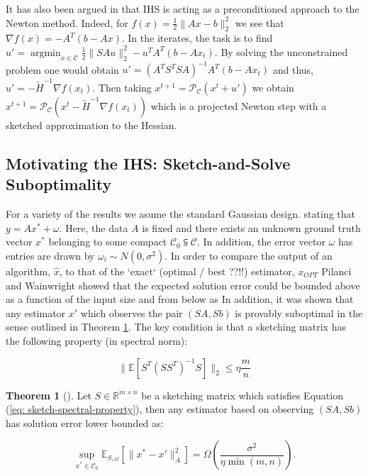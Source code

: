 \documentclass[twoside]{article}
\newcommand{\R}{\mathbb{R}}
\newcommand{\E}{\mathbb{E}}
\theoremstyle{definition}\newtheorem{thm}{Theorem}[section]
\theoremstyle{definition}\newtheorem{mydef}[thm]{Definition}
\theoremstyle{definition}\newtheorem{rem}[thm]{Remark}
\theoremstyle{definition}\newtheorem{prop}[thm]{Proposition}
\theoremstyle{definition}\newtheorem{example}[thm]{Example}
\theoremstyle{definition}\newtheorem{claim}[thm]{Claim}
\theoremstyle{definition}\newtheorem{Qu}[thm]{Question}
\theoremstyle{definition}\newtheorem{Lemma}[thm]{Lemma}
\theoremstyle{definition}\newtheorem{Cor}[thm]{Corollary}
\theoremstyle{definition}\newtheorem{Fact}[]{Fact}
\DeclareMathOperator*{\argmin}{argmin}
\begin{document}
\color{red}
It has also been argued in \cite{wang2017sketching} that IHS is acting as
a preconditioned approach to the Newton method.
Indeed, for $f(x) = \frac{1}{2} \|Ax-b\|_2^2$ we see that $\nabla f(x) =
-A^T(b-Ax)$.
In the iterates, the task is to find $u' = \argmin_{x \in \mathcal{C}}
\frac{1}{2}\|SAu\|_2^2 - u^TA^T(b-Ax_t)$.
By solving the unconstrained problem one would obtain $u' = (A^TS^TSA)^{-1}
A^T(b-Ax_t)$ and thus, $u' = - \tilde{H}^{-1} \nabla f(x_t)$.
Then taking $x^{t+1} = \mathcal{P}_{\mathcal{C}} (x^t + u')$ we obtain
$x^{t+1} = \mathcal{P}_{\mathcal{C}} (x^t - \tilde{H}^{-1}\nabla f(x_t))$
which is a projected Newton step with a sketched approximation to
the Hessian.
\color{black}

\subsection{Motivating the IHS: Sketch-and-Solve Suboptimality}

For a variety of the results we asume the standard Gaussian design.
stating that $y = A x^* + \omega$.
Here, the data $A$ is fixed and there exists an unknown ground truth
vector $x^*$ belonging to some compact $\mathcal{C}_0 \subseteqq \mathcal{C}$.
In addition, the error vector $\omega$ has entries are drawn
by $\omega_i \sim N(0, \sigma^2)$.
In order to compare the output of an algorithm, $\hat{x}$, to that of the
`exact` (optimal / best ??!!) estimator, $x_{OPT}$ Pilanci and Wainwright
showed that the expected solution error could be bounded above as a function
of the input size and from below as
In addition, it was shown that any estimator $x'$ which observes the pair
$(SA, Sb)$ is provably suboptimal in the sense outlined in Theorem
\ref{thm: clsq-lower-bound}.
The key condition is that a sketching matrix has the following
property (in spectral norm):

\begin{equation} \label{eq: sketch-spectral-property}
  \| \E \left[ S^T (S S^T)^{-1} S \right] \|_2 \le \eta \frac{m}{n}
\end{equation}

\begin{thm}[\cite{pilanci2016iterative}] \label{thm: clsq-lower-bound}
  Let $S \in \R^{m \times n}$ be a sketching matrix which satisfies
  Equation (\ref{eq: sketch-spectral-property}), then any estimator
  based on observing $(SA, Sb)$ has solution error lower bounded as:

  \begin{equation}
    \sup_{x^* \in \mathcal{C}_0} \E_{S,\omega} [\|x^* - x'\|_A^2 ]
     = \Omega \left(
    \frac{\sigma^2}{\eta \min(m,n)} \right).
  \end{equation}
\end{thm}
\end{document}
